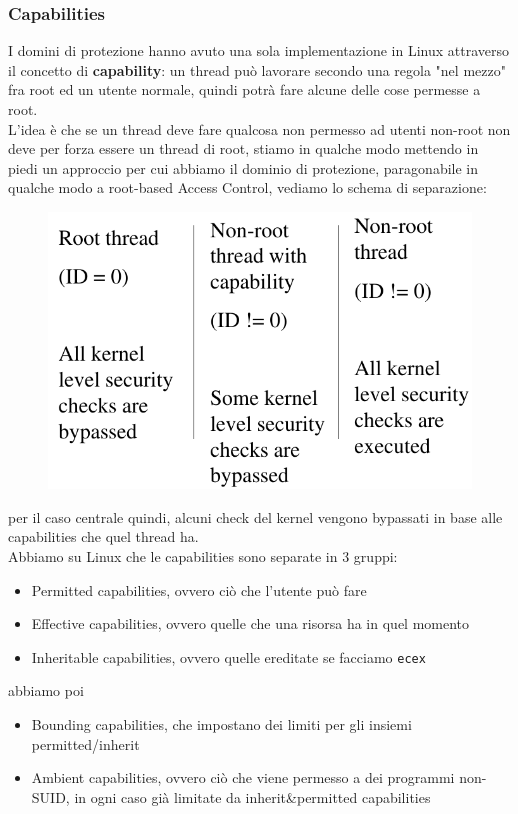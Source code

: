 \documentclass[12pt, oneside]{extbook}
\begin{document}
\subsubsection{Capabilities}
I domini di protezione hanno avuto una sola implementazione in Linux attraverso il concetto di \textbf{capability}: un thread può lavorare secondo una regola "nel mezzo" fra root ed un utente normale, quindi potrà fare alcune delle cose permesse a root.\\L'idea è che se un thread deve fare qualcosa non permesso ad utenti non-root non deve per forza essere un thread di root, stiamo in qualche modo mettendo in piedi un approccio per cui abbiamo il dominio di protezione, paragonabile in qualche modo a root-based Access Control, vediamo lo schema di separazione:
\begin{figure}[!h]
	\includegraphics[scale=0.4]{immagini/capabilities_scheme.png}
\end{figure}
per il caso centrale quindi, alcuni check del kernel vengono bypassati in base alle capabilities che quel thread ha.\\Abbiamo su Linux che le capabilities sono separate in 3 gruppi:
\begin{itemize}
	\item Permitted capabilities, ovvero ciò che l'utente può fare
	\item Effective capabilities, ovvero quelle che una risorsa ha in quel momento
	\item Inheritable capabilities, ovvero quelle ereditate se facciamo \texttt{ecex}
\end{itemize}
abbiamo poi
\begin{itemize}
	\item Bounding capabilities, che impostano dei limiti per gli insiemi permitted/inherit
	\item Ambient capabilities, ovvero ciò che viene permesso a dei programmi non-SUID, in ogni caso già limitate da inherit\&permitted capabilities
\end{itemize}
\end{document}
